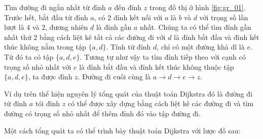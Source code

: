 Tìm đường đi ngắn nhất từ đỉnh $a$ đến đỉnh $z$ trong đồ thị ở hình \ref{fig:gr_01}.\\
Trước hết, bắt đầu từ đỉnh $a$, có 2 đỉnh kết nối với $a$ là $b$ và $d$ với trọng số 
lần lượt là $4$ và $2$, đương nhiên $d$ là đỉnh gần $a$ nhất. Chúng ta có thể tìm đỉnh 
gần nhất thứ 2 bằng cách liệt kê tất cả các đường đi với $d$ là đỉnh bắt đầu và đỉnh 
kết thúc không nằm trong tập $\{a, d\}$. Tính từ đỉnh $d$, chỉ có một đường khả dĩ là $e$.
Từ đó ta có tập $\{a, d, e\}$. Tương tự như vậy ta tìm đỉnh tiếp theo với cạnh có trọng số 
nhỏ nhất với $e$ là đỉnh bắt đầu và đỉnh kết thúc không thuộc tập $\{a, d, e\}$, ta được 
đỉnh $z$. Đường đi cuối cùng là $a \to d \to e \to z$.

Ví dụ trên thể hiện nguyên lý tổng quát của thuật toán Dijkstra đó là đường đi từ đỉnh $a$
tói đỉnh $z$ có thể được xây dựng bằng cách liệt kê các đường đi và tìm đường có trọng số 
nhỏ nhất để thêm đỉnh đó vào tập đường đi.

Một cách tổng quát ta có thể trình bày thuật toán Dijkstra với lược đồ sau:
